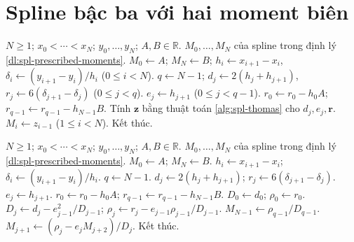 \documentclass[12pt,a4paper,oneside]{book}
\numberwithin{algorithm}{chapter}
\theoremstyle{definition}
\newcommand{\R}{\mathbb{R}}
\begin{document}
\section{Spline bậc ba với hai moment biên}
\begin{algorithm}[H]
\caption{Moment spline với $S''(x_0)=A$, $S''(x_N)=B$: sơ lược}
\label{alg:spl-prescribed-moments-short}
\begin{algorithmic}[1]
\Require $N\geq1$; $x_0<\cdots<x_N$; $y_0,\ldots,y_N$; $A,B\in\R$.
\Ensure $M_0,\ldots,M_N$ của spline trong định lý \ref{dl:spl-prescribed-moments}.
\State $M_0\gets A$; $M_N\gets B$; $h_i\gets x_{i+1}-x_i$, $\delta_i\gets(y_{i+1}-y_i)/h_i$ ($0\leq i<N$).
 \State $q\gets N-1$; $d_j\gets2(h_j+h_{j+1})$, $r_j\gets6(\delta_{j+1}-\delta_j)$ ($0\leq j<q$).
 \State $e_j\gets h_{j+1}$ ($0\leq j<q-1$).
 \State $r_0\gets r_0-h_0A$; $r_{q-1}\gets r_{q-1}-h_{N-1}B$.
 \State Tính $\boldsymbol z$ bằng thuật toán \ref{alg:spl-thomas} cho $d_j,e_j,\boldsymbol r$.
 \State $M_i\gets z_{i-1}$ ($1\leq i<N$).
\EndIf
\Statex
\State Kết thúc.
\end{algorithmic}
\end{algorithm}
\begin{algorithm}[H]
\caption{Moment spline với $S''(x_0)=A$, $S''(x_N)=B$: chi tiết}
\label{alg:spl-prescribed-moments}
\begin{algorithmic}[1]
\Require $N\geq1$; $x_0<\cdots<x_N$; $y_0,\ldots,y_N$; $A,B\in\R$.
\Ensure $M_0,\ldots,M_N$ của spline trong định lý \ref{dl:spl-prescribed-moments}.
\State $M_0\gets A$; $M_N\gets B$.
 \State $h_i\gets x_{i+1}-x_i$; $\delta_i\gets(y_{i+1}-y_i)/h_i$.
\EndFor
\Statex
{}
 \State $q\gets N-1$.
  \State $d_j\gets2(h_j+h_{j+1})$; $r_j\gets6(\delta_{j+1}-\delta_j)$.
 \EndFor
 \Statex
  \State $e_j\gets h_{j+1}$.
 \EndFor
 \Statex
 \State $r_0\gets r_0-h_0A$; $r_{q-1}\gets r_{q-1}-h_{N-1}B$.
 \State $D_0\gets d_0$; $\rho_0\gets r_0$.
  \State $D_j\gets d_j-e_{j-1}^2/D_{j-1}$; $\rho_j\gets r_j-e_{j-1}\rho_{j-1}/D_{j-1}$.
 \EndFor
 \Statex
 \State $M_{N-1}\gets\rho_{q-1}/D_{q-1}$.
  \State $M_{j+1}\gets(\rho_j-e_jM_{j+2})/D_j$.
 \EndFor
\EndIf
\Statex
\State Kết thúc.
\end{algorithmic}
\end{algorithm}

\end{document}

